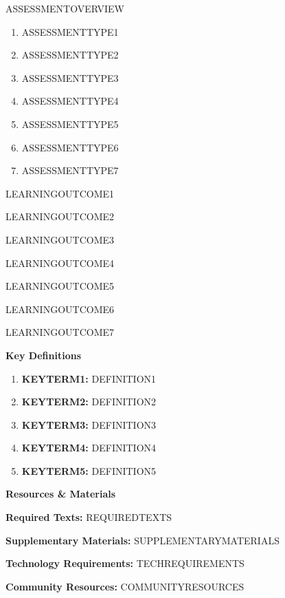 \documentclass{article}
\begin{document}
ASSESSMENTOVERVIEW

\begin{enumerate}
	
\item ASSESSMENTTYPE1
 
\item ASSESSMENTTYPE2
 
\item ASSESSMENTTYPE3
 
\item ASSESSMENTTYPE4
 
 \item ASSESSMENTTYPE5
 
 \item ASSESSMENTTYPE6
 
 \item ASSESSMENTTYPE7
 
\end{enumerate}

LEARNINGOUTCOME1

LEARNINGOUTCOME2

LEARNINGOUTCOME3

LEARNINGOUTCOME4

LEARNINGOUTCOME5

LEARNINGOUTCOME6

LEARNINGOUTCOME7

\pagebreak
 
{\huge \textbf{Key Definitions}}
\begin{enumerate}
	\item \textbf{KEYTERM1:} DEFINITION1
	\item \textbf{KEYTERM2:} DEFINITION2
	\item \textbf{KEYTERM3:} DEFINITION3
	\item \textbf{KEYTERM4:} DEFINITION4
	\item \textbf{KEYTERM5:} DEFINITION5
\end{enumerate}

\pagebreak



{\huge \textbf{Resources \& Materials}}

\textbf{Required Texts:} REQUIREDTEXTS

\textbf{Supplementary Materials:} SUPPLEMENTARYMATERIALS

\textbf{Technology Requirements:} TECHREQUIREMENTS

\textbf{Community Resources:} COMMUNITYRESOURCES

\vspace{1cm}
\end{document}
